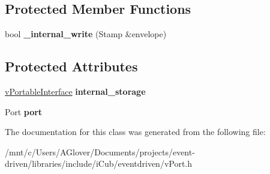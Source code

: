 \subsection*{Protected Member Functions}
\begin{DoxyCompactItemize}
\item 
\mbox{\label{classev_1_1vWritePort_a05c3debed09851bd024782ca0e4a7b54}} 
bool {\bfseries \+\_\+internal\+\_\+write} (Stamp \&envelope)
\end{DoxyCompactItemize}
\subsection*{Protected Attributes}
\begin{DoxyCompactItemize}
\item 
\mbox{\label{classev_1_1vWritePort_af9ffcc74c80d4c04f2447c718c52f270}} 
\hyperlink{classev_1_1vPortableInterface}{v\+Portable\+Interface} {\bfseries internal\+\_\+storage}
\item 
\mbox{\label{classev_1_1vWritePort_a0cb1d83ab6473e736660b9e95a5e35b9}} 
Port {\bfseries port}
\end{DoxyCompactItemize}


The documentation for this class was generated from the following file\+:\begin{DoxyCompactItemize}
\item 
/mnt/c/\+Users/\+A\+Glover/\+Documents/projects/event-\/driven/libraries/include/i\+Cub/eventdriven/v\+Port.\+h\end{DoxyCompactItemize}
